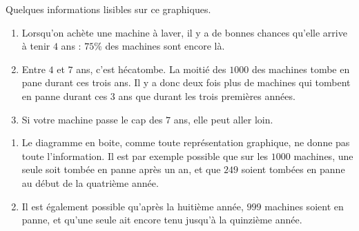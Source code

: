\begin{example}
    Quelques informations lisibles sur ce graphiques.
    \begin{enumerate}
        \item
            Lorsqu'on achète une machine à laver, il y a de bonnes chances qu'elle arrive à tenir \( 4\) ans : \( 75\%\) des machines sont encore là.
        \item
            Entre \( 4\) et \( 7\) ans, c'est hécatombe. La moitié des \( 1000\) des machines tombe en pane durant ces trois ans. Il y a donc deux fois plus de machines qui tombent en panne durant ces 3 ans que durant les trois premières années.
        \item
            Si votre machine passe le cap des \( 7\) ans, elle peut aller loin.
    \end{enumerate}

    \begin{remark}
        \begin{enumerate}
            \item
                Le diagramme en boite, comme toute représentation graphique, ne donne pas toute l'information. Il est par exemple possible que sur les \( 1000\) machines, une seule soit tombée en panne après un an, et que $249$ soient tombées en panne au début de la quatrième année.
            \item
                Il est également possible qu'après la huitième année, \( 999\) machines soient en panne, et qu'une seule ait encore tenu jusqu'à la quinzième année.
        \end{enumerate}
    \end{remark}
\end{example}


